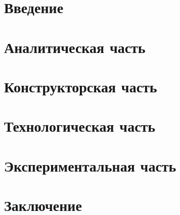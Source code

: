 \documentclass[12pt]{report}
\begin{document}
	\renewcommand\bibname{Список литературы}
	
	
	
	\tableofcontents
	\newpage
	
	\chapter*{Введение}
	
	\newpage
	
	\chapter{Аналитическая часть}
	
	\newpage
	
	\chapter{Конструкторская часть}
	
	\newpage
	
	\chapter{Технологическая часть}
	
	\newpage
	
	\chapter{Экспериментальная часть}
	
	\newpage
	
	\chapter*{Заключение}
	
	\newpage
	
\end{document}
